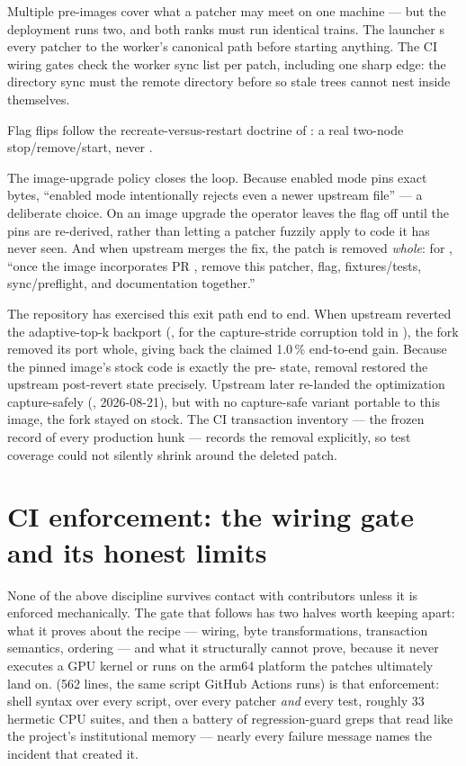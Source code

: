 Multiple pre-images cover what a patcher may meet on one machine --- but the
deployment runs two, and both ranks must run identical trains. The launcher
s every patcher
to the worker's canonical  path before starting anything.
The CI wiring gates check the worker sync list per patch, including one
sharp edge: the  directory sync must
 the remote directory before  so stale trees
cannot nest inside themselves.

Flag flips follow the recreate-versus-restart doctrine of
: a real two-node stop/remove/start, never
.

The image-upgrade policy closes the loop. Because enabled mode pins exact
bytes, ``enabled mode intentionally rejects even a newer upstream file'' ---
a deliberate choice. On an image upgrade the operator leaves the flag off
until the pins are re-derived, rather than letting a patcher fuzzily apply to
code it has never seen. And when upstream merges the fix, the patch is
removed \emph{whole}: for , ``once the image incorporates
PR , remove this patcher, flag, fixtures/tests,
sync/preflight, and documentation together.''

The repository has exercised this exit path end to end. When upstream reverted the
 adaptive-top-k backport (, for the
capture-stride corruption told in ), the fork removed its port
whole, giving back the claimed 1.0\,\% end-to-end gain. Because the
pinned image's stock code is exactly the pre- state, removal
restored the upstream post-revert state precisely. Upstream later re-landed
the optimization capture-safely (, 2026-08-21), but with no
capture-safe variant portable to this image, the fork stayed on stock. The
CI transaction inventory --- the frozen record of every production hunk ---
records the removal explicitly, so test coverage could not silently shrink
around the deleted patch.

\section{CI enforcement: the wiring gate and its honest limits}
\label{sec:patches-ci}

None of the above discipline survives contact with contributors unless it is
enforced mechanically. The gate that follows has two halves worth keeping
apart: what it proves about the recipe --- wiring, byte transformations,
transaction semantics, ordering --- and what it structurally cannot prove,
because it never executes a GPU kernel or runs on the arm64 platform the
patches ultimately land on.  (562 lines, the same
script GitHub Actions runs) is that enforcement: shell syntax over every
script,  over every patcher \emph{and} every test, roughly
33 hermetic CPU suites, and then a battery of regression-guard greps that
read like the project's institutional memory --- nearly every failure message
names the incident that created it.

